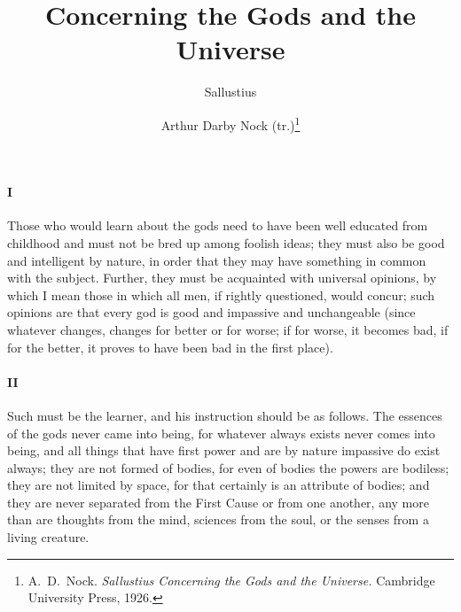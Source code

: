 \documentclass[12pt]{article}
\title{\Huge\swshape Concerning the Gods and the Universe}
\author{Sallustius \and Arthur Darby Nock (tr.)\footnote{A.~D.~Nock.
\textit{Sallustius Concerning the Gods and the Universe.} Cambridge University
Press, 1926.}}
\date{}
\begin{document}
\maketitle

\paragraph{I} Those who would learn about the gods need to have been well
educated from childhood and must not be bred up among foolish ideas; they must
also be good and intelligent by nature, in order that they may have something
in common with the subject. Further, they must be acquainted with universal
opinions, by which I mean those in which all men, if rightly questioned, would
concur; such opinions are that every god is good and impassive and unchangeable
(since whatever changes, changes for better or for worse; if for worse, it
becomes bad, if for the better, it proves to have been bad in the first place).

\paragraph{II} Such must be the learner, and his instruction should be as
follows. The essences of the gods never came into being, for whatever always
exists never comes into being, and all things that have first power and are by
nature impassive do exist always; they are not formed of bodies, for even of
bodies the powers are bodiless; they are not limited by space, for that
certainly is an attribute of bodies; and they are never separated from the
First Cause or from one another, any more than are thoughts from the mind,
sciences from the soul, or the senses from a living creature.
\end{document}
